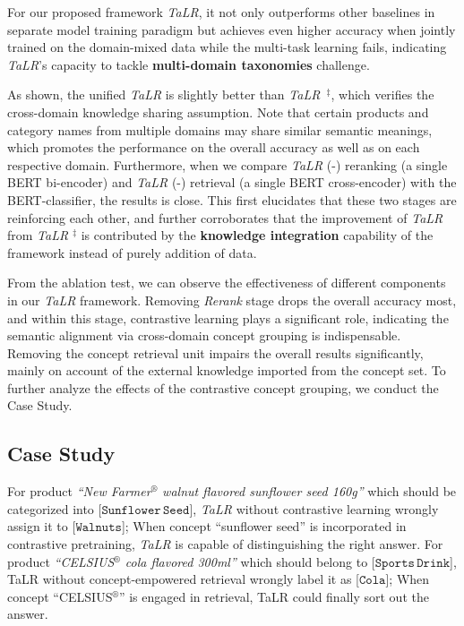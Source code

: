 For our proposed framework \textit{TaLR}, it not only outperforms other baselines in separate model training paradigm but achieves even higher accuracy when jointly trained on the domain-mixed data while the multi-task learning fails,
indicating \textit{TaLR}'s capacity to tackle \textbf{multi-domain taxonomies} challenge. 

As shown, the unified \textit{TaLR} is slightly better than \textit{TaLR}~$^{\ddagger}$, which
verifies the cross-domain knowledge sharing assumption. Note that certain products and category names from multiple domains 
may share similar semantic meanings, which promotes the performance on the overall accuracy as well as on each respective domain. Furthermore, when we compare \textit{TaLR} (-) reranking (a single BERT bi-encoder) and \textit{TaLR} (-) retrieval (a single BERT cross-encoder) with the BERT-classifier, the results is close. 
This first elucidates that these two stages are reinforcing each other, and further corroborates that the improvement of \textit{TaLR} from \textit{TaLR} $^{\ddagger}$ is contributed by the \textbf{knowledge integration} capability of the framework instead of purely addition of data.

From the ablation test, we can observe the effectiveness of different components in our \textit{TaLR} framework. 
Removing \textit{Rerank} stage drops the overall accuracy most, and within this stage, contrastive learning plays a significant role, indicating the semantic alignment via cross-domain concept grouping is indispensable.
Removing the concept retrieval unit impairs the overall results significantly, mainly on account of the external knowledge imported from the concept set. 
To further analyze the effects of the contrastive concept grouping, we conduct the Case Study.

\subsection{Case Study}
For product \textit{``New Farmer$^\circledR$ walnut flavored sunflower seed 160g''} which should be categorized into [$\mathtt{Sunflower\,Seed}$], \textit{TaLR} without contrastive learning wrongly assign it to [$\mathtt{Walnuts}$]; When concept ``sunflower seed'' is incorporated in contrastive pretraining, \textit{TaLR} is capable of distinguishing the right answer.
For product \textit{``CELSIUS$^\circledR$ cola flavored 300ml''} which should belong to [$\mathtt{Sports\,Drink}$], TaLR without concept-empowered retrieval wrongly label it as [$\mathtt{Cola}$]; When concept ``CELSIUS$^\circledR$'' is engaged in retrieval, TaLR could finally sort out the answer.

